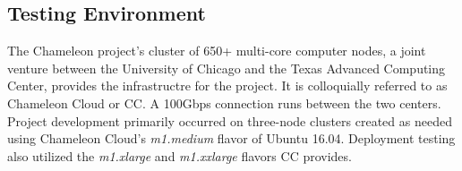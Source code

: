 \documentclass[9pt,twocolumn,twoside]{../../styles/osajnl}
\begin{document}
\subsection{Testing Environment}
The Chameleon project's cluster of 650+ multi-core computer nodes, a joint venture between the University of Chicago and the Texas Advanced Computing Center, provides the infrastructre for the project.  It is colloquially referred to as Chameleon Cloud or CC.  A 100Gbps connection runs between the two centers. Project development primarily occurred on three-node clusters created as needed using Chameleon Cloud's \textit{m1.medium} flavor of Ubuntu 16.04.  Deployment testing also utilized the \textit{m1.xlarge} and \textit{m1.xxlarge} flavors CC provides.

\end{document}
